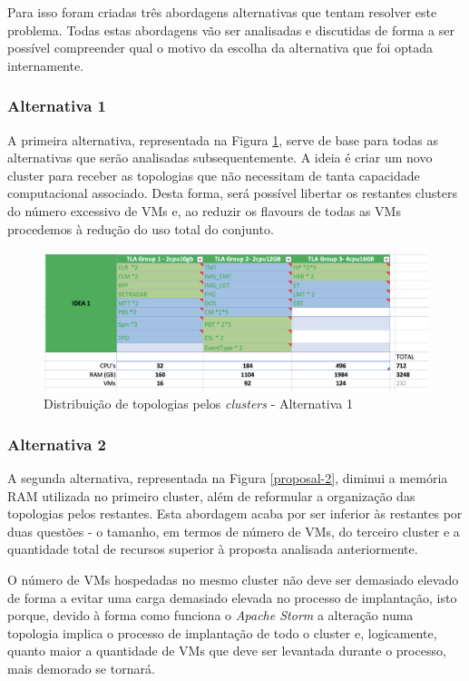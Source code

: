 Para isso foram criadas três abordagens alternativas que tentam resolver este problema. Todas estas
abordagens vão ser analisadas e discutidas de forma a ser possível compreender qual o motivo da
escolha da alternativa que foi optada internamente.

\subsubsection{Alternativa 1}

A primeira alternativa, representada na Figura \ref{proposal-1}, serve de base para todas as
alternativas que serão analisadas subsequentemente. A ideia é criar um novo \gls{cluster}
para receber as topologias que não necessitam de tanta capacidade computacional associado. Desta 
forma, será possível libertar os restantes \glspl{cluster} do número excessivo de \acp{VM} 
e, ao reduzir os \glspl{flavour} de todas as \acp{VM} procedemos à redução do uso total do
conjunto.

\begin{figure}[H]
  \centerline{\includegraphics[scale=0.4]{media/content/analise/proposal-1.png}}
  \caption{Distribuição de topologias pelos \textit{clusters} - Alternativa 1}
  \label{proposal-1}
\end{figure}

\subsubsection{Alternativa 2}

A segunda alternativa, representada na Figura \ref{proposal-2}, diminui a memória RAM utilizada no
primeiro \gls{cluster}, além de reformular a organização das topologias pelos restantes. Esta 
abordagem acaba por ser inferior às restantes por duas questões - o tamanho, em termos de número 
de \acp{VM}, do terceiro \gls{cluster} e a quantidade total de recursos superior à proposta
analisada anteriormente.

O número de \acp{VM} hospedadas no mesmo \gls{cluster} não deve ser demasiado elevado de forma a
evitar uma carga demasiado elevada no processo de implantação, isto porque, devido à forma como 
funciona o \textit{Apache Storm} a alteração numa topologia implica o processo de implantação de
todo o \gls{cluster} e, logicamente, quanto maior a quantidade de \acp{VM} que deve ser levantada
durante o processo, mais demorado se tornará.

